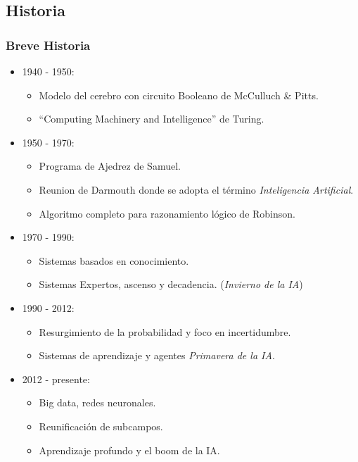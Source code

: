 \documentclass[10pt]{beamer}
\begin{document}
\subsection{Historia}
\begin{frame}[allowframebreaks]
    \frametitle{Breve Historia}
    \begin{itemize}
        \item 1940 - 1950:
            \begin{itemize}
                \item Modelo del cerebro con circuito Booleano de McCulluch \& Pitts.
                \item ``Computing Machinery and Intelligence'' de Turing.
            \end{itemize}
        \item 1950 - 1970:
            \begin{itemize}
                \item Programa de Ajedrez de Samuel.
                \item Reunion de Darmouth donde se adopta el término \textit{Inteligencia Artificial}.
                \item Algoritmo completo para razonamiento lógico de Robinson.
            \end{itemize}
        \item 1970 - 1990:
            \begin{itemize}
                \item Sistemas basados en conocimiento.
                \item Sistemas Expertos, ascenso y decadencia. (\textit{Invierno de la IA})
            \end{itemize}
        \item 1990 - 2012:
            \begin{itemize}
                \item Resurgimiento de la probabilidad y foco en incertidumbre.
                \item Sistemas de aprendizaje y agentes \textit{Primavera de la IA}.
            \end{itemize}
        \item 2012 - presente:
            \begin{itemize}
                \item Big data, redes neuronales.
                \item Reunificación de subcampos.
                \item Aprendizaje profundo y el boom de la IA.
            \end{itemize}
    \end{itemize}
\end{frame}
\end{document}
